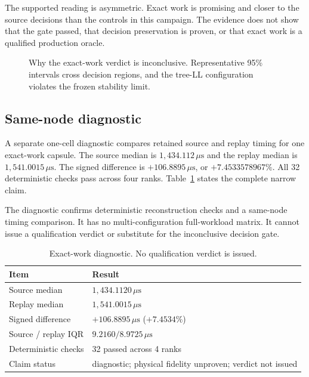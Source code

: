 \documentclass[10pt,twocolumn]{article}
\newcommand{\us}{\,\mu\mathrm{s}}
\begin{document}
The supported reading is asymmetric. Exact work is promising and closer to the
source decisions than the controls in this campaign. The evidence does not
show that the gate passed, that decision preservation is proven, or that exact
work is a qualified production oracle.

\begin{figure}[t]
  \centering
  \resizebox{0.95\textwidth}{!}{}
  \caption{Why the exact-work verdict is inconclusive. Representative 95\%
  intervals cross decision regions, and the tree-LL configuration violates the
  frozen stability limit.}
  \label{fig:inconclusive}
\end{figure}

\subsection{Same-node diagnostic}

A separate one-cell diagnostic compares retained source and replay timing for
one exact-work capsule. The source median is $1{,}434.112\us$ and the replay
median is $1{,}541.0015\us$. The signed difference is $+106.8895\us$, or
$+7.4533578967\%$. All 32 deterministic checks pass across four ranks.
Table~\ref{tab:diagnostic} states the complete narrow claim.

The diagnostic confirms deterministic reconstruction checks and a same-node
timing comparison. It has no multi-configuration full-workload matrix. It
cannot issue a qualification verdict or substitute for the inconclusive
decision gate.

\begin{table}[t]
\caption{Exact-work diagnostic. No qualification verdict is issued.}
\label{tab:diagnostic}
\centering\small
\begin{tabularx}{\columnwidth}{@{}lX@{}}
\toprule
Item & Result \\
\midrule
Source median & $1{,}434.1120\us$ \\
Replay median & $1{,}541.0015\us$ \\
Signed difference & $+106.8895\us$ ($+7.4534\%$) \\
Source / replay IQR & $9.2160 / 8.9725\us$ \\
Deterministic checks & 32 passed across 4 ranks \\
Claim status & diagnostic; physical fidelity unproven; verdict not issued \\
\bottomrule
\end{tabularx}
\end{table}
\end{document}
